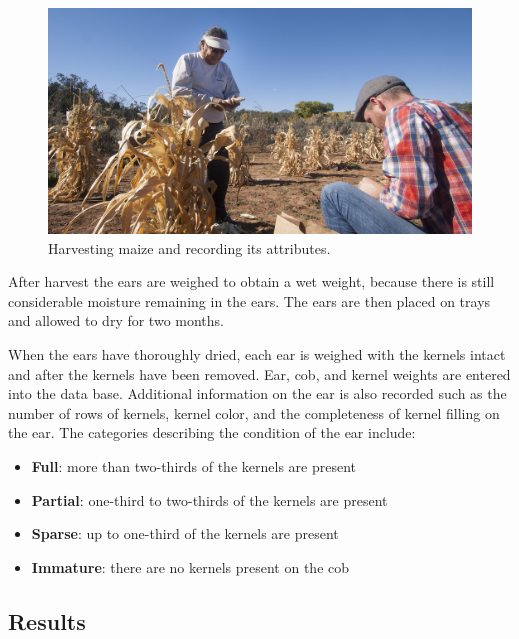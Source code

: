 \documentclass[12pt,]{article}
\providecommand{\tightlist}{%
  \setlength{\itemsep}{0pt}\setlength{\parskip}{0pt}}
\begin{document}
\begin{figure}
\centering
\includegraphics{./images/harvesting.jpg}
\caption{Harvesting maize and recording its attributes.}
\end{figure}

After harvest the ears are weighed to obtain a wet weight, because there is still considerable moisture remaining in the ears. The ears are then placed on trays and allowed to dry for two months.

When the ears have thoroughly dried, each ear is weighed with the kernels intact and after the kernels have been removed. Ear, cob, and kernel weights are entered into the data base. Additional information on the ear is also recorded such as the number of rows of kernels, kernel color, and the completeness of kernel filling on the ear. The categories describing the condition of the ear include:

\begin{itemize}
\tightlist
\item
  \textbf{Full}: more than two-thirds of the kernels are present
\item
  \textbf{Partial}: one-third to two-thirds of the kernels are present
\item
  \textbf{Sparse}: up to one-third of the kernels are present
\item
  \textbf{Immature}: there are no kernels present on the cob
\end{itemize}

\hypertarget{results}{%
\subsection{Results}\label{results}}
\end{document}
